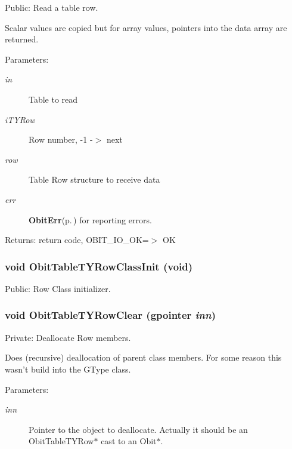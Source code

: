 Public: Read a table row. 

Scalar values are copied but for array values, pointers into the data array are returned. \begin{Desc}
\item[Parameters:]
\begin{description}
\item[{\em in}]Table to read \item[{\em i\-TYRow}]Row number, -1 -$>$ next \item[{\em row}]Table Row structure to receive data \item[{\em err}]{\bf Obit\-Err}{\rm (p.\,\pageref{structObitErr})} for reporting errors. \end{description}
\end{Desc}
\begin{Desc}
\item[Returns:]return code, OBIT\_\-IO\_\-OK=$>$ OK \end{Desc}
\subsubsection{\setlength{\rightskip}{0pt plus 5cm}void Obit\-Table\-TYRow\-Class\-Init (void)}\label{ObitTableTY_8c_a26}


Public: Row Class initializer. 

\subsubsection{\setlength{\rightskip}{0pt plus 5cm}void Obit\-Table\-TYRow\-Clear (gpointer {\em inn})}\label{ObitTableTY_8c_a7}


Private: Deallocate Row members. 

Does (recursive) deallocation of parent class members. For some reason this wasn't build into the GType class. \begin{Desc}
\item[Parameters:]
\begin{description}
\item[{\em inn}]Pointer to the object to deallocate. Actually it should be an Obit\-Table\-TYRow$\ast$ cast to an Obit$\ast$. \end{description}
\end{Desc}
